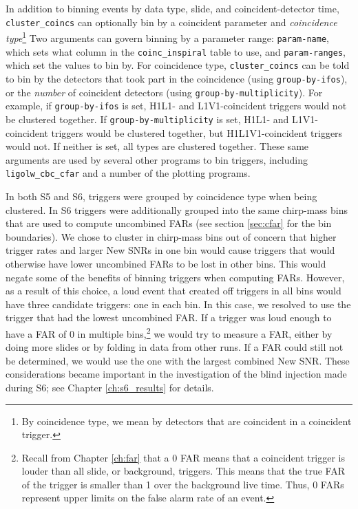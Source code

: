 In addition to binning events by data type, slide, and coincident-detector
time, \verb|cluster_coincs| can optionally bin by a coincident parameter and
\emph{coincidence type}\footnote{By coincidence type, we mean by detectors that
are coincident in a coincident trigger.} Two arguments can govern binning by a
parameter range: \verb|param-name|, which sets what column in the
\verb|coinc_inspiral| table to use, and \verb|param-ranges|, which set the
values to bin by. For coincidence type, \verb|cluster_coincs| can be told to
bin by the detectors that took part in the coincidence (using
\verb|group-by-ifos|), or the \emph{number} of coincident detectors (using
\verb|group-by-multiplicity|). For example, if \verb|group-by-ifos| is set,
H1L1- and L1V1-coincident triggers would not be clustered together. If
\verb|group-by-multiplicity| is set, H1L1- and L1V1-coincident triggers would
be clustered together, but H1L1V1-coincident triggers would not. If neither is
set, all types are clustered together. These same arguments are used by several
other programs to bin triggers, including \verb|ligolw_cbc_cfar| and a number
of the plotting programs.

In both \ac{S5} and \ac{S6}, triggers were grouped by coincidence type when
being clustered. In \ac{S6} triggers were additionally grouped into the same
chirp-mass bins that are used to compute uncombined \acp{FAR} (see section
\ref{sec:cfar} for the bin boundaries). We chose to cluster in chirp-mass bins
out of concern that higher trigger rates and larger New \acp{SNR} in one bin
would cause triggers that would otherwise have lower uncombined \acp{FAR} to be
lost in other bins. This would negate some of the benefits of binning triggers
when computing \acp{FAR}. However, as a result of this choice, a loud event
that created off triggers in all bins would have three candidate triggers: one
in each bin. In this case, we resolved to use the trigger that had the lowest
uncombined \ac{FAR}. If a trigger was loud enough to have a \ac{FAR} of $0$ in
multiple bins,\footnote{Recall from Chapter \ref{ch:far} that a 0 \ac{FAR}
means that a coincident trigger is louder than all slide, or background,
triggers. This means that the true \ac{FAR} of the trigger is smaller than 1
over the background live time. Thus, 0 \acp{FAR} represent upper limits on the
false alarm rate of an event.} we would try to measure a \ac{FAR}, either by
doing more slides or by folding in data from other runs. If a \ac{FAR} could
still not be determined, we would use the one with the largest combined New
\ac{SNR}. These considerations became important in the investigation of the
blind injection made during \ac{S6}; see Chapter \ref{ch:s6_results} for
details.

